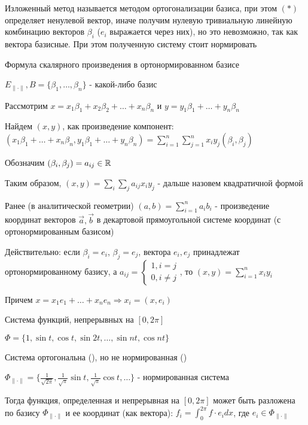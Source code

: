 \documentclass[12pt]{article}
\begin{document}
    Изложенный метод называется методом ортогонализации базиса, при этом $(*)$ определяет ненулевой вектор, 
    иначе получим нулевую тривиальную линейную комбинацию векторов $\beta_i$ ($e_i$ выражается через них), но это невозможно, 
    так как вектора базисные.
    При этом полученную систему стоит нормировать

    \Ex Формула скалярного произведения в ортонормированном базисе

    $E_{\|\cdot\|}, B = \{\beta_1, \dots, \beta_n\}$ - какой-либо базис

    Рассмотрим $x = x_1 \beta_1 + x_2 \beta_2 + \dots + x_n \beta_n$ и $y = y_1 \beta_1 + \dots + y_n \beta_n$

    Найдем $(x, y)$, как произведение компонент: $(x_1 \beta_1 + \dots + x_n \beta_n, y_1 \beta_1 + \dots + y_n \beta_n) = \sum_{i = 1}^n \sum_{j = 1}^n x_i y_j (\beta_i, \beta_j)$

    Обозначим $(\beta_i, \beta_j) = a_{ij} \in \mathbb{R}$

    Таким образом, $(x, y) = \sum_i \sum_j a_{ij} x_i y_j$ - дальше назовем квадратичной формой

    Ранее (в аналитической геометрии) $(a, b) = \sum_{i = 1}^n a_i b_i$ - произведение координат векторов $\vec{a}, \vec{b}$ в
    декартовой прямоугольной системе координат (с ортонормированным базисом)

    Действительно: если $\beta_i = e_i$, $\beta_j = e_j$, вектора $e_i, e_j$ принадлежат ортонормированному базису, 
    а $a_{ij} = \begin{cases}1, i = j \\ 0, i \neq j\end{cases}$, то $(x, y) = \sum_{i = 1}^n x_i y_i$

    Причем $x = x_1 e_1 + \dots + x_n e_n \Longrightarrow x_i = (x, e_i)$

    \Ex Система функций, непрерывных на $[0, 2\pi]$

    $\Phi = \{1, \sin t, \cos t, \sin 2t, \dots, \sin nt, \cos nt\}$

    Система ортогональна (\Lab), но не нормированная (\Lab)

    $\Phi_{\|\cdot\|} = \{\frac{1}{\sqrt{2\pi}}, \frac{1}{\sqrt{\pi}}\sin t, \frac{1}{\sqrt{\pi}} \cos t, \dots\}$ - нормированная система

    Тогда функция, определенная и непрерывная на $[0, 2\pi]$ может быть разложена по базису $\Phi_{\|\cdot\|}$
    и ее координат (как вектора): $f_i = \int_0^{2\pi} f \cdot e_i dx$, где $e_i \in \Phi_{\|\cdot\|}$
\end{document}
